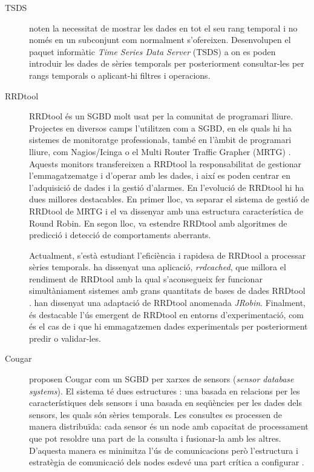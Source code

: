 \begin{description}
\item[TSDS]
\textcite{weigel10} noten la necessitat de mostrar les dades en tot el seu rang temporal i no només en un subconjunt com normalment s'ofereixen. Desenvolupen el paquet informàtic \emph{Time Series Data Server} (TSDS) \parencite{tsds} a on es poden introduir les dades de sèries temporals per posteriorment consultar-les per rangs temporals o aplicant-hi filtres i operacions.





\item[RRDtool]
RRDtool \parencite{rrdtool} {é}s un SGBD molt usat per la comunitat de programari lliure. Projectes en diversos camps l'utilitzen com a SGBD, en els quals hi ha sistemes de monitoratge professionals, també en l'àmbit de programari lliure, com Nagios/Icinga \parencite{nagios,icinga} o el Multi Router Traffic Grapher (MRTG) \parencite{mrtg}. Aquests monitors transfereixen a RRDtool la responsabilitat de gestionar l'emmagatzematge i d'operar amb les dades, i així es poden centrar en l'adquisició de dades i la gestió d'alarmes. 
En l'evolució de RRDtool hi ha dues millores destacables. En primer lloc, \textcite{lisa98:oetiker} va separar el sistema de gestió de RRDtool de MRTG i el va dissenyar amb una estructura característica de Round Robin. En segon lloc,  \textcite{lisa00:brutlag} va estendre RRDtool amb algoritmes de predicció i detecció de comportaments aberrants. 

Actualment, s'està estudiant l'eficiència i rapidesa de RRDtool a processar sèries temporals. \textcite{carder:rrdcached} ha dissenyat una aplicació, \emph{rrdcached}, que millora el rendiment de RRDtool amb la qual s'aconsegueix fer funcionar  simultàniament sistemes amb grans quantitats de bases de dades RRDtool \parencite{lisa07:plonka}. \textcite{jrobin} han dissenyat una adaptació de RRDtool anomenada \emph{JRobin}. 
Finalment, és destacable l'ús emergent de RRDtool en entorns d'experimentació, com és el cas de \textcite{zhang07} i \textcite{chilingaryan10} que hi emmagatzemen dades experimentals per posteriorment predir o validar-les.


\item[Cougar]
\textcite{cougar,fung02} proposen Cougar com un SGBD per xarxes de sensors (\emph{sensor database systems}). El sistema té dues estructures \parencite{bonnet01}: una basada en relacions per les característiques dels sensors i una basada en seqüències per les dades dels sensors, les quals són sèries temporals.
Les consultes es processen de manera distribuïda: cada sensor és un node amb capacitat de processament que pot resoldre una part de la consulta i fusionar-la amb les altres. D'aquesta manera es minimitza l'ús de comunicacions però l'estructura i estratègia de comunicació dels nodes esdevé una part crítica a configurar \parencite{demers03}.


\end{description}
